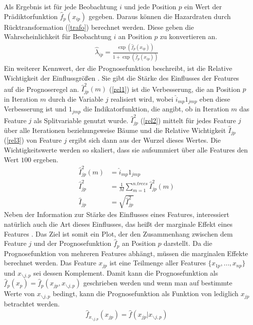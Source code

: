 Als Ergebnis ist für jede Beobachtung $i$ und jede Position $p$ ein Wert der Prädiktorfunktion $\hat{f}_p(x_{ip})$ gegeben. Daraus können die Hazardraten durch Rücktransformation (\ref{trafo}) berechnet werden. Diese geben die Wahrscheinlichkeit für Beobachtung $i$ an Position $p$ zu konvertieren an.
\begin{align}
	\hat{\lambda}_{ip} = \frac{\exp(\hat{f}_p(x_{ip}))}{1+\exp(\hat{f}_p(x_{ip}))} \label{trafo}
\end{align}
Ein weiterer Kennwert, der die Prognosefunktion beschreibt, ist die Relative Wichtigkeit der Einflussgrößen \cite{fried_greedy}. Sie gibt die Stärke des Einflusses der Features auf die Prognoseregel an. $\hat{I}_{jp}^2(m)$ (\ref{rel1}) ist die Verbesserung, die an Position $p$ in Iteration $m$ durch die Variable $j$ realisiert wird, wobei $\hat{i}_{mp} 1_{jmp}$ eben diese Verbesserung ist und $1_{jmp}$ die Indikatorfunktion, die angibt, ob in Iteration $m$ das Feature $j$ als Splitvariable genutzt wurde. $\hat{I}_{jp}^2$ (\ref{rel2}) mittelt für jedes Feature $j$ über alle Iterationen beziehungsweise Bäume und die Relative Wichtigkeit $\hat{I}_{jp}$ (\ref{rel3}) von Feature $j$ ergibt sich dann aus der Wurzel dieses Wertes. Die Wichtigkeitswerte werden so skaliert, dass sie aufsummiert über alle Features den Wert $100$ ergeben.
\begin{align}
	\hat{I}_{jp}^2(m) &= \hat{i}_{mp} 1_{jmp} \label{rel1} \\
	\hat{I}_{jp}^2 &= \frac{1}{M} \sum_{m=1}^{n.trees} \hat{I}_{jp}^2(m) \label{rel2} \\
	\hat{I}_{jp} &= \sqrt{\hat{I}_{jp}^2} \label{rel3}
\end{align}
Neben der Information zur Stärke des Einflusses eines Features, interessiert natürlich auch die Art dieses Einflusses, das heißt der marginale Effekt eines Features \cite{fried_greedy}. Das Ziel ist somit ein Plot, der den Zusammenhang zwischen dem Feature $j$ und der Prognosefunktion $\hat{f}_p$ an Position $p$ darstellt. Da die Prognosefunktion von mehreren Features abhängt, müssen die marginalen Effekte berechnet werden. Das Feature $x_{jp}$ ist eine Teilmenge aller Features $\{x_{1p},...,x_{np}\}$ und $x_{\backslash j,p}$ sei dessen Komplement. Damit kann die Prognosefunktion als $\hat{f}_p(x_p)=\hat{f}_p(x_{jp},x_{\backslash j,p})$ geschrieben werden und wenn man auf bestimmte Werte von $x_{\backslash j,p}$ bedingt, kann die Prognosefunktion als Funktion von lediglich $x_{jp}$ betrachtet werden.
\begin{align}
	\hat{f}_{x_{\backslash j,p}}(x_{jp}) = \hat{f}(x_{jp}|x_{\backslash j,p})
\end{align}
